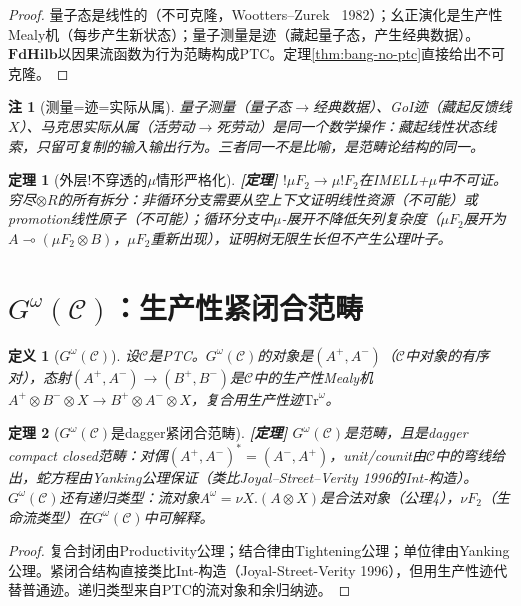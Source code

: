 \documentclass[11pt,a4paper]{article}
\newtheorem{definition}{定义}
\newtheorem{theorem}{定理}
\newtheorem{remark}{注}
\newcommand{\lvl}[1]{\hfill\textbf{\footnotesize[#1]}}
\newcommand{\lvP}{\lvl{定理}}
\newcommand{\bang}{{!}}
\newcommand{\tensor}{\otimes}
\begin{document}
\begin{proof}
量子态是线性的（不可克隆，Wootters--Zurek~\cite{wootters82} 1982）；幺正演化是生产性Mealy机（每步产生新状态）；量子测量是迹（藏起量子态，产生经典数据）。$\mathbf{FdHilb}$以因果流函数为行为范畴构成PTC。定理\ref{thm:bang-no-ptc}直接给出不可克隆。
\end{proof}

\begin{remark}[测量=迹=实际从属]
量子测量（量子态$\to$经典数据）、GoI迹（藏起反馈线$X$）、马克思实际从属（活劳动$\to$死劳动）是同一个数学操作：藏起线性状态线索，只留可复制的输入输出行为。三者同一不是比喻，是范畴论结构的同一。
\end{remark}

\begin{theorem}[外层$\bang$不穿透的$\mu$情形严格化]\label{thm:mu-rigorous}\lvP
$\bang\mu F_2\to\mu\bang F_2$在IMELL+$\mu$中不可证。穷尽$\otimes R$的所有拆分：非循环分支需要从空上下文证明线性资源（不可能）或promotion线性原子（不可能）；循环分支中$\mu$-展开不降低矢列复杂度（$\mu F_2$展开为$A\multimap(\mu F_2\tensor B)$，$\mu F_2$重新出现），证明树无限生长但不产生公理叶子。
\end{theorem}

\section{$G^\omega(\mathcal{C})$：生产性紧闭合范畴}

\begin{definition}[$G^\omega(\mathcal{C})$]\label{def:gomega}
设$\mathcal{C}$是PTC。$G^\omega(\mathcal{C})$的对象是$(A^+,A^-)$（$\mathcal{C}$中对象的有序对），态射$(A^+,A^-)\to(B^+,B^-)$是$\mathcal{C}$中的生产性Mealy机$A^+\tensor B^-\tensor X\to B^+\tensor A^-\tensor X$，复合用生产性迹$\mathrm{Tr}^\omega$。
\end{definition}

\begin{theorem}[$G^\omega(\mathcal{C})$是dagger紧闭合范畴]\label{thm:gomega-compact}\lvP
$G^\omega(\mathcal{C})$是范畴，且是dagger compact closed范畴：对偶$(A^+,A^-)^*=(A^-,A^+)$，unit/counit由$\mathcal{C}$中的弯线给出，蛇方程由Yanking公理保证（类比Joyal--Street--Verity 1996的Int-构造）。$G^\omega(\mathcal{C})$还有递归类型：流对象$A^\omega=\nu X.(A\tensor X)$是合法对象（公理4），$\nu F_2$（生命流类型）在$G^\omega(\mathcal{C})$中可解释。
\end{theorem}

\begin{proof}
复合封闭由Productivity公理；结合律由Tightening公理；单位律由Yanking公理。紧闭合结构直接类比Int-构造（Joyal-Street-Verity 1996），但用生产性迹代替普通迹。递归类型来自PTC的流对象和余归纳迹。
\end{proof}
\end{document}
